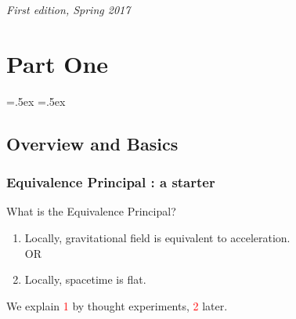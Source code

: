 \documentclass[11pt,fleqn]{book} %
\begin{document}
\noindent \textit{First edition, Spring 2017} %



\usechapterimagefalse

\pagestyle{empty} %

\tableofcontents %

\cleardoublepage %

\pagestyle{fancy} %


\part{Part One}

\abovedisplayskip=.5ex
\belowdisplayskip=.5ex
\chapter{Overview and Basics}

\section{Equivalence Principal : a starter}
What is the Equivalence Principal?
\begin{emphbox}
\begin{enumerate}[label=\textcolor{red}{\textcircled{\tiny{\arabic*}}}, leftmargin=*]
\item Locally, gravitational field is equivalent to acceleration.\\
  OR
\item Locally, spacetime is flat.
\end{enumerate}
\end{emphbox}
We explain \textcolor{red}{\textcircled{\tiny{1}}} by thought experiments,
\textcolor{red}{\textcircled{\tiny{2}}} later.
\end{document}
